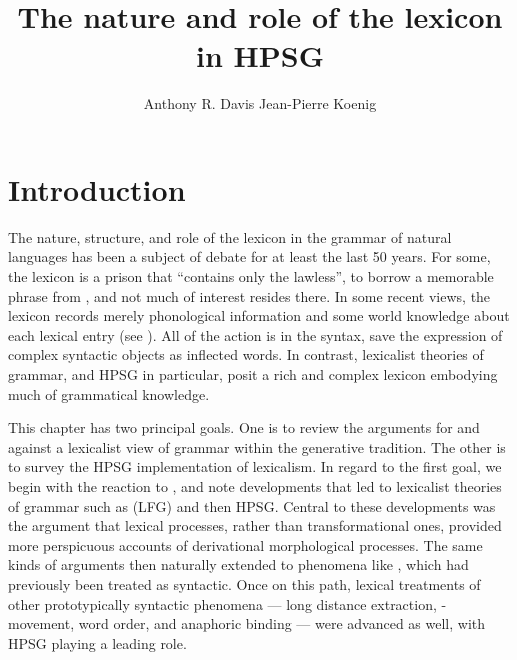 \documentclass[output=paper
 	        ,biblatex
                ,babelshorthands
                ,newtxmath
                ,draftmode
                ,colorlinks, citecolor=brown
]{langscibook}
\author{%
Anthony R. Davis\affiliation{Southern Oregon University}%
\lastand Jean-Pierre Koenig\affiliation{University at Buffalo}%
}
\title{The nature and role of the lexicon in HPSG}
\begin{document}
\maketitle
\label{chap-lexicon}

\section{Introduction}


The nature, structure, and role of the lexicon in the grammar of natural languages has been a
subject of debate for at least the last 50 years. For some, the lexicon is a prison that ``contains
only the lawless'', to borrow a memorable phrase from , and not
much of interest resides there. In some recent views, the lexicon records merely phonological
information and some world knowledge about each lexical entry (see \citealt{Marantz1997}). All of
the action is in the syntax, save the expression of complex syntactic objects as inflected words.
In contrast, lexicalist theories of grammar, and HPSG in particular, posit a rich and complex
lexicon embodying much of grammatical knowledge.

This chapter has two principal goals.  One is to review the arguments for and against a lexicalist
view of grammar within the generative tradition.  The other is to survey the HPSG implementation of
lexicalism. In regard to the first goal, we begin with the reaction to ,
and note developments that led to lexicalist theories of grammar such as  (LFG) and then HPSG.  Central to these developments was the argument that lexical
processes, rather than transformational ones, provided more perspicuous accounts of derivational
morphological processes.  The same kinds of arguments then naturally extended to phenomena like
, which had previously been treated as syntactic.  Once on this path, lexical
treatments of other prototypically syntactic phenomena — long distance extraction,
-movement, word order, and anaphoric binding — were advanced as well, with HPSG playing a
leading role.
\end{document}
